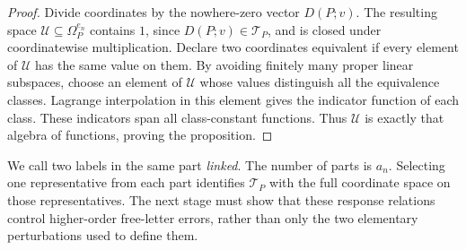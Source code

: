 \begin{proof}
Divide coordinates by the nowhere-zero vector $D(P;v)$.  The resulting
space $\mathcal U\subseteq\Omega_P^{e_n}$ contains $1$, since
$D(P;v)\in\mathcal T_P$, and is closed under coordinatewise
multiplication.  Declare two coordinates equivalent if every element
of $\mathcal U$ has the same value on them.  By avoiding finitely
many proper linear subspaces, choose an element of $\mathcal U$
whose values distinguish all the equivalence classes.  Lagrange
interpolation in this element gives the indicator function of each
class.  These indicators span all class-constant functions.  Thus
$\mathcal U$ is exactly that algebra of functions, proving the
proposition.
\end{proof}

We call two labels in the same part \emph{linked}.  The number of
parts is $a_n$.  Selecting one representative from each part
identifies $\mathcal T_P$ with the full coordinate space on those
representatives.  The next stage must show that these response
relations control higher-order free-letter errors, rather than only
the two elementary perturbations used to define them.
